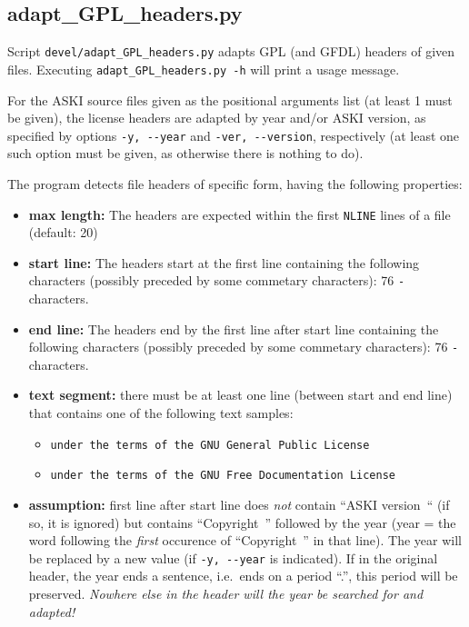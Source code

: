 \documentclass[12pt,a4paper]{article}
\newcommand{\lcode}[1]{\nolinkurl{#1}}
\newcommand{\lcodetitle}[1]{ {\ttfamily #1} }
\newcommand{\ASKI}{ {\ttfamily ASKI} }
\begin{document}
\subsection{\lcodetitle{adapt\_GPL\_headers.py}} \label{ssec-devel_tools:adapt_GPL_headers.py}
Script \lcode{devel/adapt_GPL_headers.py} adapts GPL (and GFDL) headers of given files.
Executing \lcode{adapt_GPL_headers.py -h} will print a usage message.

For the \ASKI{} source files given as the positional arguments list (at least 1 must be
given), the license headers are adapted by year and/or \ASKI{} version, as specified by options
\lcode{-y, --year} and \lcode{-ver, --version}, respectively (at least one such option must be given, 
as otherwise there is nothing to do).

The program detects file headers of specific form, having the following properties:
\begin{itemize}
\item[] {\bf max length:} The headers are expected within the first \lcode{NLINE} lines of a file (default: 20)
\item[] {\bf start line:} The headers start at the first line containing the following characters (possibly 
  preceded by some commetary characters): 76 \lcode{-} characters.
\item[] {\bf end line:} The headers end by the first line after start line containing the following characters 
  (possibly preceded by some commetary characters): 76 \lcode{-} characters.
\item[] {\bf text segment:} there must be at least one line (between start and end line) that contains one of the
  following text samples:
  \begin{itemize}
  \item[] \lcode{under the terms of the GNU General Public License}
  \item[] \lcode{under the terms of the GNU Free Documentation License}
  \end{itemize}
\item[] {\bf assumption:} first line after start line does \emph{not} contain ``ASKI version~`` (if so, it is ignored)
      but contains ``Copyright~'' followed by the year (year = the word following the \emph{first} occurence of 
      ``Copyright~'' in that line). The year will be replaced by a new value (if \lcode{-y, --year} is indicated).
      If in the original header, the year ends a sentence, i.e.\ ends on a period ``.'', this period
      will be preserved. \emph{Nowhere else in the header will the year be searched for and adapted!}
\end{itemize}
\end{document}
